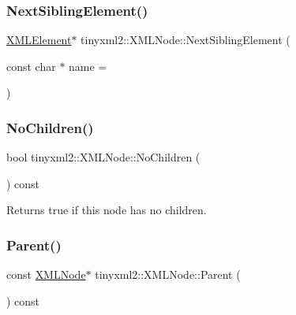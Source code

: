 \subsubsection{\texorpdfstring{Next\+Sibling\+Element()}{NextSiblingElement()}\hspace{0.1cm}{\footnotesize\ttfamily [2/2]}}
{\footnotesize\ttfamily \mbox{\hyperlink{classtinyxml2_1_1_x_m_l_element}{X\+M\+L\+Element}}$\ast$ tinyxml2\+::\+X\+M\+L\+Node\+::\+Next\+Sibling\+Element (\begin{DoxyParamCaption}\item[{const char $\ast$}]{name = {} }\end{DoxyParamCaption})\hspace{0.3cm}{\ttfamily [inline]}}

\mbox{\label{classtinyxml2_1_1_x_m_l_node_ac3ab489e6e202a3cd1762d3b332e89d4}} 
\subsubsection{\texorpdfstring{No\+Children()}{NoChildren()}}
{\footnotesize\ttfamily bool tinyxml2\+::\+X\+M\+L\+Node\+::\+No\+Children (\begin{DoxyParamCaption}{ }\end{DoxyParamCaption}) const\hspace{0.3cm}{\ttfamily [inline]}}



Returns true if this node has no children. 

\mbox{\label{classtinyxml2_1_1_x_m_l_node_ae0f62bc186c56c2e0483ebd52dbfbe34}} 
\subsubsection{\texorpdfstring{Parent()}{Parent()}\hspace{0.1cm}{\footnotesize\ttfamily [1/2]}}
{\footnotesize\ttfamily const \mbox{\hyperlink{classtinyxml2_1_1_x_m_l_node}{X\+M\+L\+Node}}$\ast$ tinyxml2\+::\+X\+M\+L\+Node\+::\+Parent (\begin{DoxyParamCaption}{ }\end{DoxyParamCaption}) const\hspace{0.3cm}{\ttfamily [inline]}}



